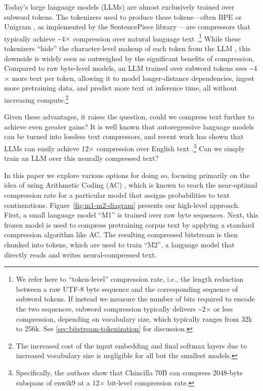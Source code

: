 Today's large language models (LLMs) are almost exclusively trained over subword tokens. The tokenizers used to produce these tokens---often BPE \cite{gage1994new, sennrich-etal-2016-neural} or Unigram \cite{kudo-2018-subword}, as implemented by the SentencePiece library \cite{kudo-richardson-2018-sentencepiece}---are compressors that typically achieve \textasciitilde{}4$\times$ compression over natural language text \cite{xue-etal-2022-byt5}.\footnote{We refer here to ``token-level'' compression rate, i.e., the length reduction between a raw UTF-8 byte sequence and the corresponding sequence of subword tokens. If instead we measure the number of bits required to encode the two sequences, subword compression typically delivers \textasciitilde{}2$\times$ or less compression, depending on vocabulary size, which typically ranges from 32k to 256k. See \ref{sec:bitstream-tokenization} for discussion.} While these tokenizers ``hide'' the character-level makeup of each token from the LLM \cite{xue-etal-2022-byt5, liu-etal-2023-character}, this downside is widely seen as outweighed by the significant benefits of compression. Compared to raw byte-level models, an LLM trained over subword tokens sees \textasciitilde{}4$\times$ more text per token, allowing it to model longer-distance dependencies, ingest more pretraining data, and predict more text at inference time, all without increasing compute.\footnote{The increased cost of the input embedding and final softmax layers due to increased vocabulary size is negligible for all but the smallest models.}

Given these advantages, it raises the question, could we compress text further to achieve even greater gains? It is well known that autoregressive language models can be turned into lossless text compressors, and recent work has shown that LLMs can easily achieve 12$\times$ compression over English text \cite{deletangLanguageModelingCompression2024}.\footnote{Specifically, the authors show that Chincilla 70B \cite{hoffmann2022training} can compress 2048-byte subspans of enwik9 at a 12$\times$ bit-level compression rate.} Can we simply train an LLM over this neurally compressed text?

In this paper we explore various options for doing so, focusing primarily on the idea of using Arithmetic Coding (AC) \cite{wittenArithmeticCodingData1987}, which is known to reach the near-optimal compression rate for a particular model that assigns probabilities to text continuations. Figure~\ref{fig:m1-m2-diagram} presents our high-level approach. First, a small language model ``M1'' is trained over raw byte sequences. Next, this frozen model is used to compress pretraining corpus text by applying a standard compression algorithm like AC\@. The resulting compressed bitstream is then chunked into tokens, which are used to train ``M2'', a language model that directly reads and writes neural-compressed text.

